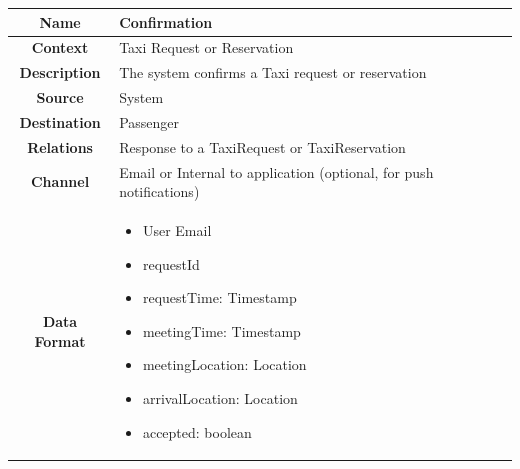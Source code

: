\documentclass[11pt, a4paper,titlepage]{article}
\begin{document}
				\begin{tabularx}{\textwidth}{| c | X |}
					\hline
					\textbf{Name} & 
					Confirmation
					\\
					\hline
					\textbf{Context} & 
					Taxi Request or Reservation
					\\
					\hline
					\textbf{Description} & 
					The system confirms a Taxi request or reservation
					\\
					\hline
					\textbf{Source} &
					System
					\\
					\hline
					\textbf{Destination} & 
					Passenger
					\\
					\hline
					\textbf{Relations} & 
					Response to a TaxiRequest or TaxiReservation
					\\
					\hline
					\textbf{Channel} & 
					Email or Internal to application (optional, for push notifications)
					\\
					\hline
					\textbf{Data Format} & 
					\begin{itemize}
						\item User Email
						\item requestId
						\item requestTime: Timestamp
						\item meetingTime: Timestamp
						\item meetingLocation: Location
						\item arrivalLocation: Location
						\item accepted: boolean
					\end{itemize}
					\\
					\hline		
				\end{tabularx}
				
\end{document}
